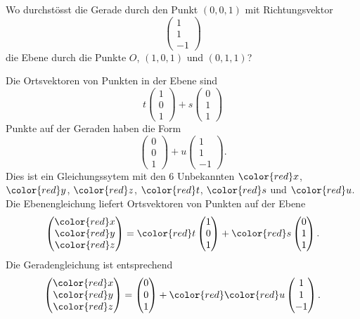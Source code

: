 Wo durchstösst die Gerade durch den Punkt $(0,0,1)$ mit Richtungsvektor
\[
\begin{pmatrix}1\\1\\-1\end{pmatrix}
\]
die Ebene durch die Punkte $O$, $(1,0,1)$ und $(0,1,1)$?


\begin{loesung}
Die Ortsvektoren von Punkten in der Ebene sind
\[
t
\begin{pmatrix}1\\0\\1\end{pmatrix}
+
s
\begin{pmatrix}0\\1\\1\end{pmatrix}
\]
Punkte auf der Geraden haben die Form
\[
\begin{pmatrix}0\\0\\1\end{pmatrix}+u\begin{pmatrix}1\\1\\-1\end{pmatrix}.
\]
Dies ist ein Gleichungssytem mit den 6 Unbekannten
$\color{red}x$,
$\color{red}y$,
$\color{red}z$,
$\color{red}t$,
$\color{red}s$ und
$\color{red}u$.
Die Ebenengleichung liefert Ortsvektoren von Punkten auf der Ebene
\[
\begin{pmatrix}
{\color{red}x}\\
{\color{red}y}\\
{\color{red}z}
\end{pmatrix}
=
{\color{red}t}
\begin{pmatrix}1\\0\\1\end{pmatrix}
+
{\color{red}s}
\begin{pmatrix}0\\1\\1\end{pmatrix}.
\]
Die Geradengleichung ist entsprechend
\[
\begin{pmatrix}
{\color{red}x}\\
{\color{red}y}\\
{\color{red}z}
\end{pmatrix}
=
\begin{pmatrix}0\\0\\1\end{pmatrix}+{\color{red}}{\color{red}u}\begin{pmatrix}1\\1\\-1\end{pmatrix}.
\]
\end{loesung}
